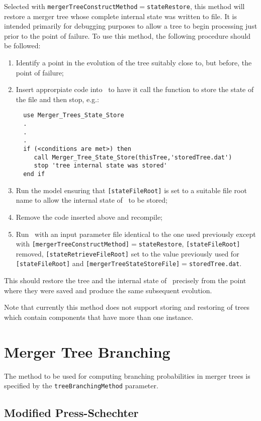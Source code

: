 Selected with {\tt mergerTreeConstructMethod}$=${\tt stateRestore}, this method will restore a merger tree whose complete internal state was written to file. It is intended primarily for debugging purposes to allow a tree to begin processing just prior to the point of failure. To use this method, the following procedure should be followed:
\begin{enumerate}
 \item Identify a point in the evolution of the tree suitably close to, but before, the point of failure;
 \item Insert approrpiate code into \glc\ to have it call the function to store the state of the file and then stop, e.g.:
 \begin{verbatim}
  use Merger_Trees_State_Store
  .
  .
  .
  if (<conditions are met>) then
     call Merger_Tree_State_Store(thisTree,'storedTree.dat')
     stop 'tree internal state was stored'
  end if
 \end{verbatim}
 \item Run the model ensuring that {\tt [stateFileRoot]} is set to a suitable file root name to allow the internal state of \glc\ to be stored;
 \item Remove the code inserted above and recompile;
 \item Run \glc\ with an input parameter file identical to the one used previously except with {\tt [mergerTreeConstructMethod]}$=${\tt stateRestore}, {\tt [stateFileRoot]} removed, {\tt [stateRetrieveFileRoot]} set to the value previously used for {\tt [stateFileRoot]} and {\tt [mergerTreeStateStoreFile]}$=${\tt storedTree.dat}.
\end{enumerate}
This should restore the tree and the internal state of \glc\ precisely from the point where they were saved and produce the same subsequent evolution.

Note that currently this method does not support storing and restoring of trees which contain components that have more than one instance.

\section{Merger Tree Branching}

The method to be used for computing branching probabilities in merger trees is specified by the {\tt treeBranchingMethod} parameter.

\subsection{Modified Press-Schechter}


